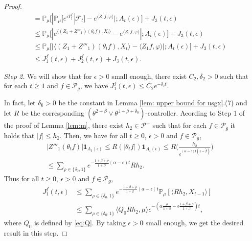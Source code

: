 \documentclass[12pt,a4paper]{amsart}
\theoremstyle{plain}
\theoremstyle{definition}
\numberwithin{equation}{section}
\begin{document}
\begin{proof}
\begin{align}
  & = \mathbb{P}_{\mu}\Big[ |\mathbb{P}_\mu [e^{i\Upsilon^f_t}| \mathscr F_{t}]-e^{\langle Z_1f, \varphi\rangle}| ; A_{t}(\epsilon) \Big] + J_3(t,\epsilon) \\
  & \leq \mathbb{P}_\mu \Big[ |e^{\langle (Z_1+Z'''_1) (\theta_t f),X_{t} \rangle}-e^{\langle Z_1f, \varphi\rangle} | ; A_{t}(\epsilon) \Big]+  J_3(t,\epsilon) \\
  & \leq \mathbb{P}_\mu \Big[ | \langle (Z_1+Z'''_1)(\theta_t f),X_{t} \rangle - \langle Z_1f, \varphi\rangle | ;A_{t}(\epsilon)\Big]+  J_3(t,\epsilon) \\
  & \leq J^f_1(t,\epsilon) + J^f_2(t,\epsilon)+ J_3(t,\epsilon).
\end{align}

\emph{Step 2.} We will show that for $\epsilon>0$ small enough, there exist  $C_2, \delta_2>0$ such that for each $t\geq 1$ and
$f \in \mathcal P_g$, we have $ J^f_1(t,\epsilon) \leq C_2e^{-\delta_2 t}$.

In fact, let $\delta_0 >0$ be the constant in Lemma \ref{lem: upper bound for usgx}.(7) and let $R$ be the corresponding $(\theta^{2+\beta}\vee \theta^{1+\beta+\delta_0})$-controller.
Acording to Step 1 of the proof of Lemma \ref{lem:m}, there exist $h_{2} \in \mathcal P^+$ such that for each $f \in \mathcal P_g$ it holds that $|f| \leq h_{2}$.
Then, we have for all $t\geq 0$, $\epsilon> 0$ and $f\in \mathcal P_g$,
\begin{align}
  & |Z'''_1(\theta_t f)|\mathbf{1}_{A_{t}(\epsilon)}
    \leq R(|\theta_{t} f|)\mathbf{1}_{A_{t}(\epsilon)}
    \leq R \Big(\frac{h_{2}}{e^{(\alpha-\epsilon)t(1-\tilde \beta)}}\Big) \\
  & \leq \sum_{\rho \in \{\delta_0,1\}}e^{-\frac{1+\beta+\rho}{1+\beta}(\alpha-\epsilon)t}Rh_{2}.
\end{align}
Thus for all $t\geq 0$, $\epsilon> 0$ and $f\in \mathcal P_g$,
\begin{align}
  \label{eq: estimate of J1}
  J^f_1(t,\epsilon)
  & \leq \sum_{\rho \in \{\delta_0,1\}}e^{-\frac{1+\beta+\rho}{1+\beta}(\alpha-\epsilon)t}\mathbb{P}_{\mu}[\langle Rh_2,X_{t-1}\rangle]\\
  & \leq \sum_{\rho \in \{\delta_0,1\}} \langle Q_0 R h_{2}, \mu \rangle e^{-(\alpha\frac{\rho}{1+\beta}-\epsilon\frac{1+\beta+\rho}{1+\beta})t},
\end{align}
where $Q_0$ is defined by \eqref{eq:Q}.
By taking $\epsilon>0$ small enough, we get the desired result in this step.


\end{proof}
\end{document}

